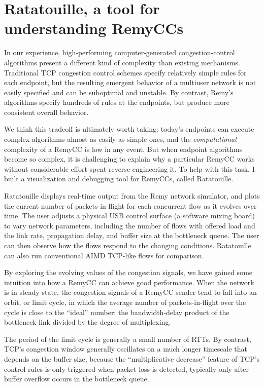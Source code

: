 \section{Ratatouille, a tool for understanding RemyCCs}

In our experience, high-performing computer-generated
congestion-control algorithms present a different kind of complexity
than existing mechanisms. Traditional TCP congestion control schemes
specify relatively simple rules for each endpoint, but the resulting
emergent behavior of a multiuser network is not easily specified and
can be suboptimal and unstable. By contrast, Remy's algorithms specify
hundreds of rules at the endpoints, but produce more consistent
overall behavior.

We think this tradeoff is ultimately worth taking: today's endpoints
can execute complex algorithms almost as easily as simple ones, and
the \textit{computational} complexity of a RemyCC is low in any
event. But when endpoint algorithms become so complex, it is
challenging to explain why a particular RemyCC works without
considerable effort spent reverse-engineering it. To help with this
task, I built a visualization and debugging tool for RemyCCs, called
Ratatouille.

Ratatouille displays real-time output from the Remy network simulator,
and plots the current number of packets-in-flight for each concurrent
flow as it evolves over time. The user adjusts a physical USB control
surface (a software mixing board) to vary network parameters,
including the number of flows with offered load and the link rate,
propagation delay, and buffer size at the bottleneck queue. The user
can then observe how the flows respond to the changing
conditions. Ratatouille can also run conventional AIMD TCP-like flows
for comparison.

By exploring the evolving values of the congestion signals, we have
gained some intuition into how a RemyCC can achieve good
performance. When the network is in steady state, the congestion
signals of a RemyCC sender tend to fall into an orbit, or limit cycle,
in which the average number of packets-in-flight over the cycle is
close to the ``ideal'' number: the bandwidth-delay product of the
bottleneck link divided by the degree of multiplexing.

The period of the limit cycle is generally a small number of RTTs. By
contrast, TCP's congestion window generally oscillates on a much
longer timescale that depends on the buffer size, because the
``multiplicative decrease'' feature of TCP's control rules is only
triggered when packet loss is detected, typically only after buffer
overflow occurs in the bottleneck queue.

